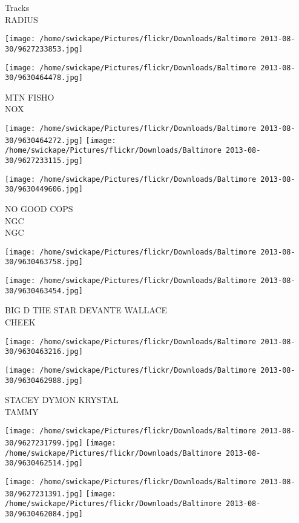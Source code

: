 \documentclass[10pt,letterpaper]{article}
\begin{document}
Tracks\\
RADIUS
\pagebreak

\texttt{[image: /home/swickape/Pictures/flickr/Downloads/Baltimore 2013-08-30/9627233853.jpg]}

\vspace{0.25in}
\texttt{[image: /home/swickape/Pictures/flickr/Downloads/Baltimore 2013-08-30/9630464478.jpg]}

MTN FISHO\\
NOX
\pagebreak

\texttt{[image: /home/swickape/Pictures/flickr/Downloads/Baltimore 2013-08-30/9630464272.jpg]}
\texttt{[image: /home/swickape/Pictures/flickr/Downloads/Baltimore 2013-08-30/9627233115.jpg]}

\texttt{[image: /home/swickape/Pictures/flickr/Downloads/Baltimore 2013-08-30/9630449606.jpg]}

NO GOOD COPS\\
NGC\\
NGC
\pagebreak

\texttt{[image: /home/swickape/Pictures/flickr/Downloads/Baltimore 2013-08-30/9630463758.jpg]}

\vspace{0.25in}
\texttt{[image: /home/swickape/Pictures/flickr/Downloads/Baltimore 2013-08-30/9630463454.jpg]}

BIG D THE STAR DEVANTE WALLACE\\
CHEEK
\pagebreak

\texttt{[image: /home/swickape/Pictures/flickr/Downloads/Baltimore 2013-08-30/9630463216.jpg]}

\vspace{0.25in}
\texttt{[image: /home/swickape/Pictures/flickr/Downloads/Baltimore 2013-08-30/9630462988.jpg]}

STACEY DYMON KRYSTAL\\
TAMMY
\pagebreak

\texttt{[image: /home/swickape/Pictures/flickr/Downloads/Baltimore 2013-08-30/9627231799.jpg]}
\texttt{[image: /home/swickape/Pictures/flickr/Downloads/Baltimore 2013-08-30/9630462514.jpg]}

\texttt{[image: /home/swickape/Pictures/flickr/Downloads/Baltimore 2013-08-30/9627231391.jpg]}
\texttt{[image: /home/swickape/Pictures/flickr/Downloads/Baltimore 2013-08-30/9630462084.jpg]}
\end{document}
